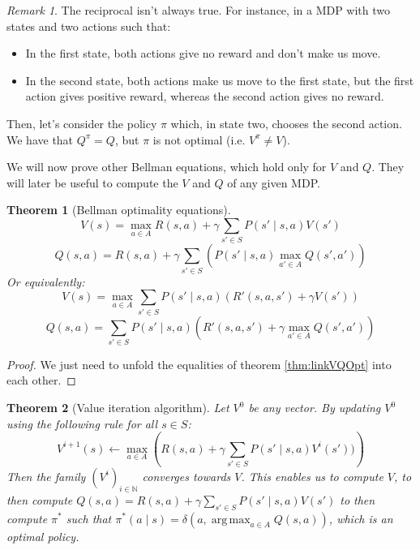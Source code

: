\documentclass{article}
\newtheorem{theorem}{Theorem}[section]
\theoremstyle{definition}
\theoremstyle{remark}
\newtheorem*{remark}{Remark}
\theoremstyle{example}
\DeclareMathOperator*{\argmax}{arg\,max} %
\begin{document}
\begin{remark}
		The reciprocal isn't always true. For instance, in a MDP with two states and two actions such that:
		\begin{itemize}
				\item In the first state, both actions give no reward and don't make us move.
				\item In the second state, both actions make us move to the first state, but the first action gives positive reward, whereas the second action gives no reward.
		\end{itemize}
		Then, let's consider the policy $\pi$ which, in state two, chooses the second action. We have that $Q^\pi = Q$, but $\pi$ is not optimal (i.e. $V^\pi \neq V$).
\end{remark}

We will now prove other Bellman equations, which hold only for $V$ and $Q$. They will later be useful to compute the $V$ and $Q$ of any given MDP.

\begin{theorem}[Bellman optimality equations]
				$$V(s) = \max_{a \in A} R(s, a) + \gamma \sum_{s' \in S} P(s' \mid s, a) V(s')$$
				$$Q(s, a) = R(s, a) + \gamma \sum_{s' \in S} (P(s' \mid s, a) \max_{a' \in A} Q(s', a'))$$
		Or equivalently:
				$$V(s) = \max_{a \in A} \sum_{s' \in S} P(s' \mid s, a)(R'(s, a, s') + \gamma V(s'))$$
				$$Q(s, a) = \sum_{s' \in S} P(s' \mid s, a)(R'(s, a, s') + \gamma \max_{a' \in A} Q(s', a'))$$
\end{theorem}

\begin{proof}
		We just need to unfold the equalities of theorem \ref{thm:linkVQOpt} into each other.
\end{proof}

\begin{theorem}[Value iteration algorithm]
		Let $V^0$ be any vector. By updating $V^0$ using the following rule for all $s \in S$:
				$$V^{i+1}(s) \leftarrow \max_{a \in A} \left(R(s, a) + \gamma \sum_{s' \in S} P(s' \mid s, a)V^i(s'))\right)$$
		Then the family $(V^i)_{i \in \mathbb{N}}$ converges towards $V$. This enables us to compute $V$, to then compute $Q(s, a) = R(s, a) + \gamma \sum_{s' \in S} P(s' \mid s, a) V(s')$ to then compute $\pi^*$ such that $\pi^*(a \mid s) = \delta(a, \argmax_{a \in A} Q(s, a))$, which is an optimal policy.
\end{theorem}
\end{document}
